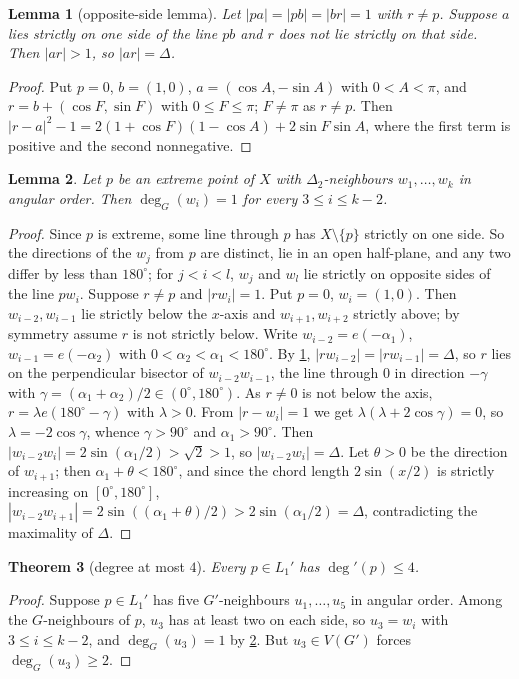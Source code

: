 \documentclass[11pt]{amsart}
\newtheorem{theorem}{Theorem}[section]
\newtheorem{lemma}[theorem]{Lemma}
\theoremstyle{definition}
\theoremstyle{remark}
\newcommand{\Dt}{\Delta_2}
\begin{document}
\begin{lemma}[opposite-side lemma]\label{lem:M}
Let $|pa|=|pb|=|br|=1$ with $r\neq p$. Suppose $a$ lies strictly on one side of the line $pb$ and $r$ does not lie strictly on that side. Then $|ar|>1$, so $|ar|=\Delta$.
\end{lemma}
\begin{proof}
Put $p=0$, $b=(1,0)$, $a=(\cos A,-\sin A)$ with $0<A<\pi$, and $r=b+(\cos F,\sin F)$ with $0\le F\le\pi$; $F\ne\pi$ as $r\ne p$. Then $|r-a|^2-1=2(1+\cos F)(1-\cos A)+2\sin F\sin A$, where the first term is positive and the second nonnegative.
\end{proof}

\begin{lemma}\label{lem:F}
Let $p$ be an extreme point of $X$ with $\Dt$-neighbours $w_1,\dots,w_k$ in angular order. Then $\deg_G(w_i)=1$ for every $3\le i\le k-2$.
\end{lemma}
\begin{proof}
Since $p$ is extreme, some line through $p$ has $X\setminus\{p\}$ strictly on one side. So the directions of the $w_j$ from $p$ are distinct, lie in an open half-plane, and any two differ by less than $180^\circ$; for $j<i<l$, $w_j$ and $w_l$ lie strictly on opposite sides of the line $pw_i$. Suppose $r\ne p$ and $|rw_i|=1$. Put $p=0$, $w_i=(1,0)$. Then $w_{i-2},w_{i-1}$ lie strictly below the $x$-axis and $w_{i+1},w_{i+2}$ strictly above; by symmetry assume $r$ is not strictly below. Write $w_{i-2}=e(-\alpha_1)$, $w_{i-1}=e(-\alpha_2)$ with $0<\alpha_2<\alpha_1<180^\circ$. By \cref{lem:M}, $|rw_{i-2}|=|rw_{i-1}|=\Delta$, so $r$ lies on the perpendicular bisector of $w_{i-2}w_{i-1}$, the line through $0$ in direction $-\gamma$ with $\gamma=(\alpha_1+\alpha_2)/2\in(0^\circ,180^\circ)$. As $r\ne0$ is not below the axis, $r=\lambda e(180^\circ-\gamma)$ with $\lambda>0$. From $|r-w_i|=1$ we get $\lambda(\lambda+2\cos\gamma)=0$, so $\lambda=-2\cos\gamma$, whence $\gamma>90^\circ$ and $\alpha_1>90^\circ$. Then $|w_{i-2}w_i|=2\sin(\alpha_1/2)>\sqrt2>1$, so $|w_{i-2}w_i|=\Delta$. Let $\theta>0$ be the direction of $w_{i+1}$; then $\alpha_1+\theta<180^\circ$, and since the chord length $2\sin(x/2)$ is strictly increasing on $[0^\circ,180^\circ]$, $|w_{i-2}w_{i+1}|=2\sin((\alpha_1+\theta)/2)>2\sin(\alpha_1/2)=\Delta$, contradicting the maximality of $\Delta$.
\end{proof}

\begin{theorem}[degree at most $4$]\label{thm:deg4}
Every $p\in L_1'$ has $\deg'(p)\le4$.
\end{theorem}
\begin{proof}
Suppose $p\in L_1'$ has five $G'$-neighbours $u_1,\dots,u_5$ in angular order. Among the $G$-neighbours of $p$, $u_3$ has at least two on each side, so $u_3=w_i$ with $3\le i\le k-2$, and $\deg_G(u_3)=1$ by \cref{lem:F}. But $u_3\in V(G')$ forces $\deg_G(u_3)\ge2$.
\end{proof}
\end{document}
